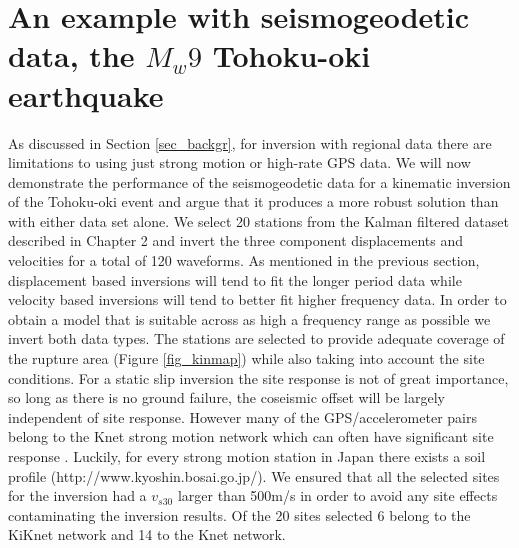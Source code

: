 \section{An example with seismogeodetic data, the $M_w9$ Tohoku-oki earthquake}

As discussed in Section \ref{sec_backgr}, for inversion with regional data there are limitations to using just strong motion or high-rate GPS data. We will now demonstrate the performance of the seismogeodetic data for a kinematic inversion of the Tohoku-oki event and argue that it produces a more robust solution than with either data set alone. We select 20 stations from the Kalman filtered dataset described in Chapter 2 and invert the three component displacements and velocities for a total of 120 waveforms. As mentioned in the previous section, displacement based inversions will tend to fit the longer period data while velocity based inversions will tend to better fit higher frequency data. In order to obtain a model that is suitable across as high a frequency range as possible we invert both data types. The stations are selected to provide adequate coverage of the rupture area (Figure \ref{fig_kinmap}) while also taking into account the site conditions. For a static slip inversion the site response is not of great importance, so long as there is no ground failure, the coseismic offset will be largely independent of site response. However many of the GPS/accelerometer pairs belong to the Knet strong motion network which can often have significant site response \citep{tsuda2006}. Luckily, for every strong motion station in Japan there exists a soil profile (http://www.kyoshin.bosai.go.jp/). We ensured that all the selected sites for the inversion had a $v_{s30}$ larger than 500m/s in order to avoid any site effects contaminating the inversion results. Of the 20 sites selected 6 belong to the KiKnet network and 14 to the Knet network.

